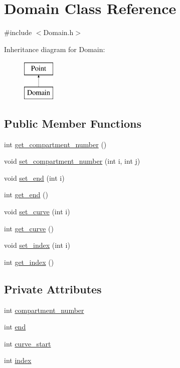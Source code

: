 \hypertarget{class_domain}{}\section{Domain Class Reference}
\label{class_domain}


{\ttfamily \#include $<$Domain.\+h$>$}

Inheritance diagram for Domain\+:\begin{figure}[H]
\begin{center}
\leavevmode
\includegraphics[height=2.000000cm]{class_domain}
\end{center}
\end{figure}
\subsection*{Public Member Functions}
\begin{DoxyCompactItemize}
\item 
int \hyperlink{class_domain_a2aeb4c39576094f7d65be83aae2c48f2}{get\+\_\+compartment\+\_\+number} ()
\item 
void \hyperlink{class_domain_a207d03cc926a3bd612ee76c282ddb10f}{set\+\_\+compartment\+\_\+number} (int i, int j)
\item 
void \hyperlink{class_domain_a4d469609eba2afb4cbaf3810fc34d4e1}{set\+\_\+end} (int i)
\item 
int \hyperlink{class_domain_aeb0bf2fcbaaaa349ce0fb11f192f5cb8}{get\+\_\+end} ()
\item 
void \hyperlink{class_domain_a2c8568b850ff8e59aedb3b66a501b003}{set\+\_\+curve} (int i)
\item 
int \hyperlink{class_domain_aa2278b647f29f47ed2adca466815da59}{get\+\_\+curve} ()
\item 
void \hyperlink{class_domain_a4b33557e861792bb9200707c9eddad1e}{set\+\_\+index} (int i)
\item 
int \hyperlink{class_domain_a24dcaa49a47c41381e46718ed7719e02}{get\+\_\+index} ()
\end{DoxyCompactItemize}
\subsection*{Private Attributes}
\begin{DoxyCompactItemize}
\item 
int \hyperlink{class_domain_ae4a3140523f5101fe60b05dbfc280fe1}{compartment\+\_\+number}
\item 
int \hyperlink{class_domain_af325c2c3f1cfbbae199d10fb8d7486e1}{end}
\item 
int \hyperlink{class_domain_a34957cc9e5ab74e87e7870198eb04ef8}{curve\+\_\+start}
\item 
int \hyperlink{class_domain_a0242b8dac23da9fe639f62bda97ea85c}{index}
\end{DoxyCompactItemize}


